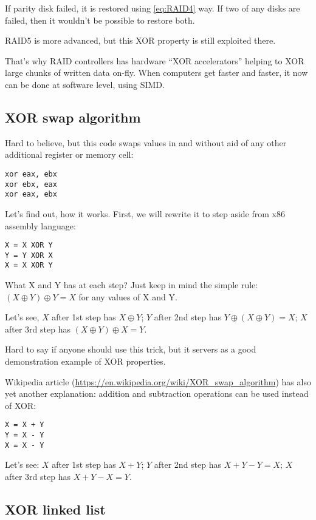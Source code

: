 If parity disk failed, it is restored using \ref{eq:RAID4} way.
If two of any disks are failed, then it wouldn't be possible to restore both.

\ac{RAID}5 is more advanced, but this XOR property is still exploited there.

That's why \ac{RAID} controllers has hardware ``XOR accelerators'' helping to XOR large chunks of written data on-fly.
When computers get faster and faster, it now can be done at software level, using \ac{SIMD}.

\subsection{XOR swap algorithm}

Hard to believe, but this code swaps values in \EAX and \EBX without aid of any other additional register or memory cell:

\begin{lstlisting}[style=customasmx86]
xor eax, ebx
xor ebx, eax
xor eax, ebx
\end{lstlisting}

Let's find out, how it works.
First, we will rewrite it to step aside from x86 assembly language:

\begin{lstlisting}
X = X XOR Y
Y = Y XOR X
X = X XOR Y
\end{lstlisting}

What X and Y has at each step?
Just keep in mind the simple rule: $(X \oplus Y) \oplus Y = X$ for any values of X and Y.

Let's see,
$X$ after 1st step has $X \oplus Y$;
$Y$ after 2nd step has $Y \oplus (X \oplus Y) = X$;
$X$ after 3rd step has $(X \oplus Y) \oplus X = Y$.

Hard to say if anyone should use this trick, but it servers as a good demonstration example of XOR properties.

Wikipedia article (\url{https://en.wikipedia.org/wiki/XOR_swap_algorithm}) has also yet another explanation:
addition and subtraction operations can be used instead of XOR:

\begin{lstlisting}
X = X + Y
Y = X - Y
X = X - Y
\end{lstlisting}

Let's see:
$X$ after 1st step has $X+Y$;
$Y$ after 2nd step has $X+Y-Y=X$;
$X$ after 3rd step has $X+Y-X=Y$.

\subsection{XOR linked list}

